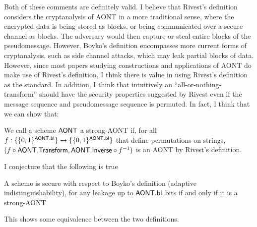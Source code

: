 \documentclass[11pt,twoside]{article}
\begin{document}
Both of these comments are definitely valid. I believe that Rivest's definition considers the cryptanalysis of AONT in a more traditional sense, where the encrypted data is being stored as blocks, or being communicated over a secure channel as blocks. The adversary would then capture or steal entire blocks of the pseudomessage. However, Boyko's definition encompasses more current forms of cryptanalysis, such as side channel attacks, which may leak partial blocks of data. However, since most papers studying constructions and applications of AONT do make use of Rivest's definition, I think there is value in using Rivest's definition as the standard. In addition, I think that intuitively an ``all-or-nothing-transform'' should have the security properties suggested by Rivest even if the message sequence and pseudomessage sequence is permuted. In fact, I think that we can show that: 

\begin{definition}
We call a scheme $\mathsf{AONT}$ a strong-AONT if, for all $f:\{\{0,1\}^{\mathsf{AONT.bl}}\}\rightarrow\{\{0,1\}^{\mathsf{AONT.bl}}\}$ that define permutations on strings, $(f\circ\mathsf{AONT.Transform},\mathsf{AONT.Inverse}\circ f^{-1})$ is an AONT by Rivest's definition. 
\end{definition}

I conjecture that the following is true

\begin{theorem}
A scheme is secure with respect to Boyko's definition (adaptive indistinguishability), for any leakage up to $\mathsf{AONT.bl}$ bits if and only if it is a strong-AONT
\end{theorem}

This shows some equivalence between the two definitions.

\appendix
\end{document}
